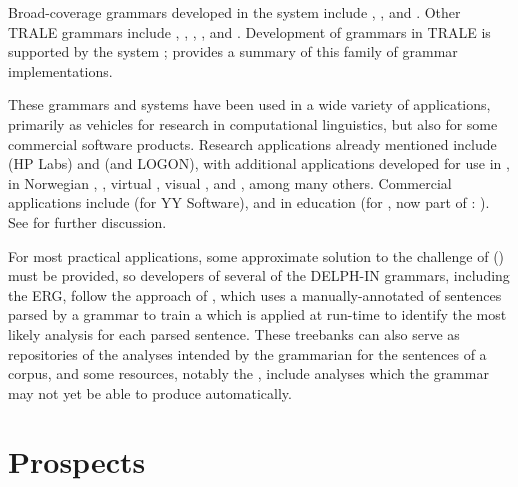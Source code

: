 \documentclass[output=paper]{langsci/langscibook}
\begin{document}
Broad-coverage grammars developed in the  system \citep{MPR2002a-u,Penn2004a-u} include  \citep{MuellerLehrbuch1},  \citep{MOeDanish-language}, and  \citep{MuellerPersian}. Other TRALE grammars include
 \citep{ML2013a},  \citep{Abzianidze2011a-u},  \citep{MuellerMalteseSketch},  \citep{Machicao-y-Priemer2015a}, and  \citep{MOe2011a}. Development of grammars in TRALE is supported by the  system \citep{MuellerGrammix}; \citet{MuellerCoreGram} provides a summary of this family of grammar implementations.

These grammars and systems have been used in a wide variety of applications, primarily as vehicles for research in computational linguistics, but also for some commercial software products.  Research applications already mentioned include  (HP Labs) and  (\verbmobil and LOGON), with additional applications developed for use in  \citep*{Sch:Kie:Spu:11},  in Norwegian \citep*{Hellanetal:13},  \citep{Herb:Cope:06}, virtual  \citep{packard2014uw}, visual  \citep{DBLP:journals/corr/KuhnleC17}, and  \citep{Flickinger:17}, among many others.  Commercial applications include  (for YY Software), and  in education (for , now part of : \citet*{Suppesetal:12}).  See  for further discussion.

For most practical applications, some approximate solution to the challenge of  () must be provided, so developers of several of the DELPH-IN grammars, including the ERG, follow the approach of \citet*{OFTM2004a-u}, which uses a manually-annotated  of sentences parsed by a grammar to train a  which is applied at run-time to identify the most likely analysis for each parsed sentence.  These treebanks can also serve as repositories of the analyses intended by the grammarian for the sentences of a corpus, and some resources, notably the  \citep*{BvNM2001a-u}, include analyses which the grammar may not yet be able to produce automatically.  

\section{Prospects}
\end{document}
